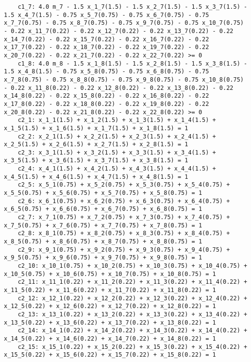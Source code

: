 \documentclass{article}[A4]
\begin{document}
\begin{lstlisting}
	c1_7: 4.0 m_7 - 1.5 x_1_7(1.5) - 1.5 x_2_7(1.5) - 1.5 x_3_7(1.5) - 1.5 x_4_7(1.5) - 0.75 x_5_7(0.75) - 0.75 x_6_7(0.75) - 0.75 x_7_7(0.75) - 0.75 x_8_7(0.75) - 0.75 x_9_7(0.75) - 0.75 x_10_7(0.75) - 0.22 x_11_7(0.22) - 0.22 x_12_7(0.22) - 0.22 x_13_7(0.22) - 0.22 x_14_7(0.22) - 0.22 x_15_7(0.22) - 0.22 x_16_7(0.22) - 0.22 x_17_7(0.22) - 0.22 x_18_7(0.22) - 0.22 x_19_7(0.22) - 0.22 x_20_7(0.22) - 0.22 x_21_7(0.22) - 0.22 x_22_7(0.22) >= 0
	c1_8: 4.0 m_8 - 1.5 x_1_8(1.5) - 1.5 x_2_8(1.5) - 1.5 x_3_8(1.5) - 1.5 x_4_8(1.5) - 0.75 x_5_8(0.75) - 0.75 x_6_8(0.75) - 0.75 x_7_8(0.75) - 0.75 x_8_8(0.75) - 0.75 x_9_8(0.75) - 0.75 x_10_8(0.75) - 0.22 x_11_8(0.22) - 0.22 x_12_8(0.22) - 0.22 x_13_8(0.22) - 0.22 x_14_8(0.22) - 0.22 x_15_8(0.22) - 0.22 x_16_8(0.22) - 0.22 x_17_8(0.22) - 0.22 x_18_8(0.22) - 0.22 x_19_8(0.22) - 0.22 x_20_8(0.22) - 0.22 x_21_8(0.22) - 0.22 x_22_8(0.22) >= 0
	c2_1: x_1_1(1.5) + x_1_2(1.5) + x_1_3(1.5) + x_1_4(1.5) + x_1_5(1.5) + x_1_6(1.5) + x_1_7(1.5) + x_1_8(1.5) = 1
	c2_2: x_2_1(1.5) + x_2_2(1.5) + x_2_3(1.5) + x_2_4(1.5) + x_2_5(1.5) + x_2_6(1.5) + x_2_7(1.5) + x_2_8(1.5) = 1
	c2_3: x_3_1(1.5) + x_3_2(1.5) + x_3_3(1.5) + x_3_4(1.5) + x_3_5(1.5) + x_3_6(1.5) + x_3_7(1.5) + x_3_8(1.5) = 1
	c2_4: x_4_1(1.5) + x_4_2(1.5) + x_4_3(1.5) + x_4_4(1.5) + x_4_5(1.5) + x_4_6(1.5) + x_4_7(1.5) + x_4_8(1.5) = 1
	c2_5: x_5_1(0.75) + x_5_2(0.75) + x_5_3(0.75) + x_5_4(0.75) + x_5_5(0.75) + x_5_6(0.75) + x_5_7(0.75) + x_5_8(0.75) = 1
	c2_6: x_6_1(0.75) + x_6_2(0.75) + x_6_3(0.75) + x_6_4(0.75) + x_6_5(0.75) + x_6_6(0.75) + x_6_7(0.75) + x_6_8(0.75) = 1
	c2_7: x_7_1(0.75) + x_7_2(0.75) + x_7_3(0.75) + x_7_4(0.75) + x_7_5(0.75) + x_7_6(0.75) + x_7_7(0.75) + x_7_8(0.75) = 1
	c2_8: x_8_1(0.75) + x_8_2(0.75) + x_8_3(0.75) + x_8_4(0.75) + x_8_5(0.75) + x_8_6(0.75) + x_8_7(0.75) + x_8_8(0.75) = 1
	c2_9: x_9_1(0.75) + x_9_2(0.75) + x_9_3(0.75) + x_9_4(0.75) + x_9_5(0.75) + x_9_6(0.75) + x_9_7(0.75) + x_9_8(0.75) = 1
	c2_10: x_10_1(0.75) + x_10_2(0.75) + x_10_3(0.75) + x_10_4(0.75) + x_10_5(0.75) + x_10_6(0.75) + x_10_7(0.75) + x_10_8(0.75) = 1
	c2_11: x_11_1(0.22) + x_11_2(0.22) + x_11_3(0.22) + x_11_4(0.22) + x_11_5(0.22) + x_11_6(0.22) + x_11_7(0.22) + x_11_8(0.22) = 1
	c2_12: x_12_1(0.22) + x_12_2(0.22) + x_12_3(0.22) + x_12_4(0.22) + x_12_5(0.22) + x_12_6(0.22) + x_12_7(0.22) + x_12_8(0.22) = 1
	c2_13: x_13_1(0.22) + x_13_2(0.22) + x_13_3(0.22) + x_13_4(0.22) + x_13_5(0.22) + x_13_6(0.22) + x_13_7(0.22) + x_13_8(0.22) = 1
	c2_14: x_14_1(0.22) + x_14_2(0.22) + x_14_3(0.22) + x_14_4(0.22) + x_14_5(0.22) + x_14_6(0.22) + x_14_7(0.22) + x_14_8(0.22) = 1
	c2_15: x_15_1(0.22) + x_15_2(0.22) + x_15_3(0.22) + x_15_4(0.22) + x_15_5(0.22) + x_15_6(0.22) + x_15_7(0.22) + x_15_8(0.22) = 1

\end{lstlisting}
\end{document}
